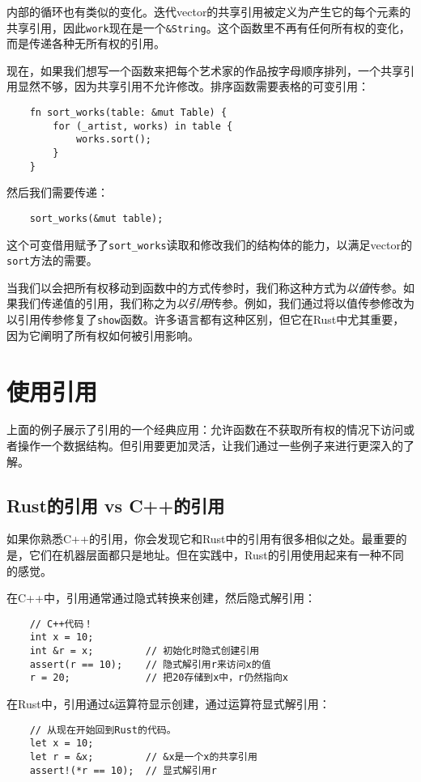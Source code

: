 内部的循环也有类似的变化。迭代vector的共享引用被定义为产生它的每个元素的共享引用，因此\texttt{work}现在是一个\texttt{\&String}。这个函数里不再有任何所有权的变化，而是传递各种无所有权的引用。

现在，如果我们想写一个函数来把每个艺术家的作品按字母顺序排列，一个共享引用显然不够，因为共享引用不允许修改。排序函数需要表格的可变引用：
\begin{verbatim}
    fn sort_works(table: &mut Table) {
        for (_artist, works) in table {
            works.sort();
        }
    }
\end{verbatim}

然后我们需要传递：
\begin{verbatim}
    sort_works(&mut table);
\end{verbatim}

这个可变借用赋予了\texttt{sort\_works}读取和修改我们的结构体的能力，以满足vector的\texttt{sort}方法的需要。

当我们以会把所有权移动到函数中的方式传参时，我们称这种方式为\emph{以值}传参。如果我们传递值的引用，我们称之为\emph{以引用}传参。例如，我们通过将以值传参修改为以引用传参修复了\texttt{show}函数。许多语言都有这种区别，但它在Rust中尤其重要，因为它阐明了所有权如何被引用影响。

\section{使用引用}

上面的例子展示了引用的一个经典应用：允许函数在不获取所有权的情况下访问或者操作一个数据结构。但引用要更加灵活，让我们通过一些例子来进行更深入的了解。

\subsection{Rust的引用 vs C++的引用}
如果你熟悉C++的引用，你会发现它和Rust中的引用有很多相似之处。最重要的是，它们在机器层面都只是地址。但在实践中，Rust的引用使用起来有一种不同的感觉。

在C++中，引用通常通过隐式转换来创建，然后隐式解引用：
\begin{verbatim}
    // C++代码！
    int x = 10;
    int &r = x;         // 初始化时隐式创建引用
    assert(r == 10);    // 隐式解引用r来访问x的值
    r = 20;             // 把20存储到x中，r仍然指向x
\end{verbatim}

在Rust中，引用通过\texttt{\&}运算符显示创建，通过\texttt{\*}运算符显式解引用：
\begin{verbatim}
    // 从现在开始回到Rust的代码。
    let x = 10;
    let r = &x;         // &x是一个x的共享引用
    assert!(*r == 10);  // 显式解引用r
\end{verbatim}

